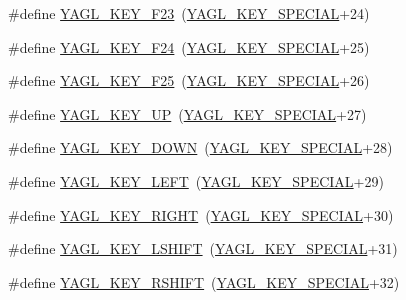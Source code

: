 \begin{DoxyCompactItemize}
\item 
\#define \hyperlink{group____consts__key__mouse_gaa475caef0d40afc0583e56c83026a7b9}{Y\-A\-G\-L\-\_\-\-K\-E\-Y\-\_\-\-F23}~(\hyperlink{group____consts__key__mouse_gae6060c5e0a8f15c67d28e1a1f0765d7b}{Y\-A\-G\-L\-\_\-\-K\-E\-Y\-\_\-\-S\-P\-E\-C\-I\-A\-L}+24)
\item 
\#define \hyperlink{group____consts__key__mouse_gaa4c96221191e5c6e885e649700eaaea2}{Y\-A\-G\-L\-\_\-\-K\-E\-Y\-\_\-\-F24}~(\hyperlink{group____consts__key__mouse_gae6060c5e0a8f15c67d28e1a1f0765d7b}{Y\-A\-G\-L\-\_\-\-K\-E\-Y\-\_\-\-S\-P\-E\-C\-I\-A\-L}+25)
\item 
\#define \hyperlink{group____consts__key__mouse_gad6389f07a769695153940895ab99c373}{Y\-A\-G\-L\-\_\-\-K\-E\-Y\-\_\-\-F25}~(\hyperlink{group____consts__key__mouse_gae6060c5e0a8f15c67d28e1a1f0765d7b}{Y\-A\-G\-L\-\_\-\-K\-E\-Y\-\_\-\-S\-P\-E\-C\-I\-A\-L}+26)
\item 
\#define \hyperlink{group____consts__key__mouse_ga975831270758acdd45e5faaa0dd9155b}{Y\-A\-G\-L\-\_\-\-K\-E\-Y\-\_\-\-U\-P}~(\hyperlink{group____consts__key__mouse_gae6060c5e0a8f15c67d28e1a1f0765d7b}{Y\-A\-G\-L\-\_\-\-K\-E\-Y\-\_\-\-S\-P\-E\-C\-I\-A\-L}+27)
\item 
\#define \hyperlink{group____consts__key__mouse_ga3e229159342a3c987160c833c2ba702e}{Y\-A\-G\-L\-\_\-\-K\-E\-Y\-\_\-\-D\-O\-W\-N}~(\hyperlink{group____consts__key__mouse_gae6060c5e0a8f15c67d28e1a1f0765d7b}{Y\-A\-G\-L\-\_\-\-K\-E\-Y\-\_\-\-S\-P\-E\-C\-I\-A\-L}+28)
\item 
\#define \hyperlink{group____consts__key__mouse_ga63f12296fd51efb4ad11bfc4463de713}{Y\-A\-G\-L\-\_\-\-K\-E\-Y\-\_\-\-L\-E\-F\-T}~(\hyperlink{group____consts__key__mouse_gae6060c5e0a8f15c67d28e1a1f0765d7b}{Y\-A\-G\-L\-\_\-\-K\-E\-Y\-\_\-\-S\-P\-E\-C\-I\-A\-L}+29)
\item 
\#define \hyperlink{group____consts__key__mouse_ga4db79d4d07f481a1abbd1d388b9cc7ce}{Y\-A\-G\-L\-\_\-\-K\-E\-Y\-\_\-\-R\-I\-G\-H\-T}~(\hyperlink{group____consts__key__mouse_gae6060c5e0a8f15c67d28e1a1f0765d7b}{Y\-A\-G\-L\-\_\-\-K\-E\-Y\-\_\-\-S\-P\-E\-C\-I\-A\-L}+30)
\item 
\#define \hyperlink{group____consts__key__mouse_ga77e3d883994ce112725cffd934340443}{Y\-A\-G\-L\-\_\-\-K\-E\-Y\-\_\-\-L\-S\-H\-I\-F\-T}~(\hyperlink{group____consts__key__mouse_gae6060c5e0a8f15c67d28e1a1f0765d7b}{Y\-A\-G\-L\-\_\-\-K\-E\-Y\-\_\-\-S\-P\-E\-C\-I\-A\-L}+31)
\item 
\#define \hyperlink{group____consts__key__mouse_ga58c13400a4e2ea857e80800beeb3e15b}{Y\-A\-G\-L\-\_\-\-K\-E\-Y\-\_\-\-R\-S\-H\-I\-F\-T}~(\hyperlink{group____consts__key__mouse_gae6060c5e0a8f15c67d28e1a1f0765d7b}{Y\-A\-G\-L\-\_\-\-K\-E\-Y\-\_\-\-S\-P\-E\-C\-I\-A\-L}+32)

\end{DoxyCompactItemize}
